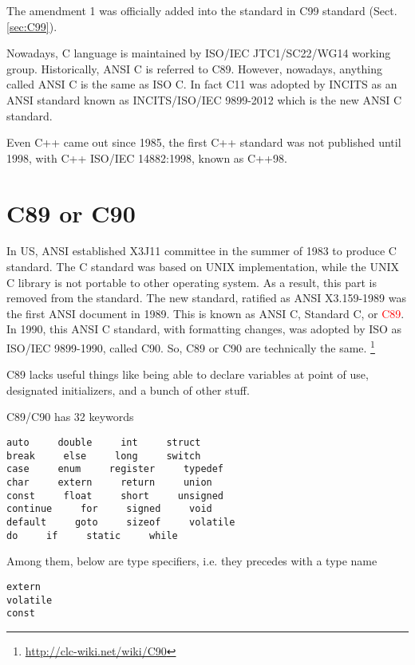 The amendment 1 was officially added into the standard in C99 standard
(Sect.\ref{sec:C99}).

Nowadays, C language is maintained by ISO/IEC JTC1/SC22/WG14 working group.
Historically, ANSI C is referred to C89. However, nowadays, anything called ANSI
C is the same as ISO C. In fact C11 was adopted by INCITS as an ANSI standard
known as INCITS/ISO/IEC 9899-2012 which is the new ANSI C standard.

Even C++ came out since 1985, the first C++ standard was not published until
1998, with  C++ ISO/IEC 14882:1998, known as C++98.




\section{C89 or C90}
\label{sec:C89-C90}

In US, ANSI established X3J11 committee in the summer of 1983 to produce C
standard. The C standard was based on UNIX implementation, while the UNIX C
library is not portable to other operating system. As a result, this part is
removed from the standard. The new standard, ratified as ANSI X3.159-1989 was
the first ANSI document in 1989. This is known as ANSI C, Standard C, or
\textcolor{red}{C89}. 
In 1990, this ANSI C standard, with formatting changes, was adopted by ISO as
ISO/IEC 9899-1990, called C90. So, C89 or C90 are technically the same.
\footnote{\url{http://clc-wiki.net/wiki/C90}}

C89 lacks useful things like being able to declare variables at point of use,
designated initializers, and a bunch of other stuff.
 

C89/C90 has 32 keywords
\begin{verbatim}
auto     double     int     struct
break     else     long     switch
case     enum     register     typedef
char     extern     return     union
const     float     short     unsigned
continue     for     signed     void
default     goto     sizeof     volatile
do     if     static     while
\end{verbatim}
Among them, below are type specifiers, i.e. they precedes with a type name 
\begin{verbatim}
extern
volatile
const
\end{verbatim}


